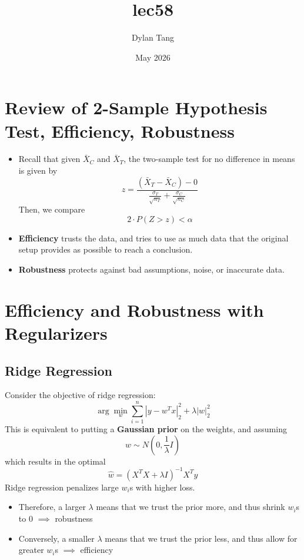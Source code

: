 \documentclass{article}
\title{lec58}
\author{Dylan Tang}
\date{May 2026}
\begin{document}
\maketitle

\section{Review of 2-Sample Hypothesis Test, Efficiency, Robustness}
\begin{itemize}
    \item Recall that given $\bar{X}_C$ and $\bar{X}_T$, the two-sample test for no difference in means is given by
\[
    z = \frac{(\bar{X}_T - \bar{X}_C) - 0}{\frac{\sigma_T}{\sqrt{n_T}} + \frac{\sigma_C}{\sqrt{n_C}}}
\]
Then, we compare
\[
    2 \cdot P(Z > z) < \alpha
\]
\item \textbf{Efficiency} trusts the data, and tries to use as much data that the original setup provides as possible to reach a conclusion.
\item \textbf{Robustness} protects against bad assumptions, noise, or inaccurate data.
\end{itemize}

\section{Efficiency and Robustness with Regularizers}
\subsection{Ridge Regression}
Consider the objective of ridge regression:
\[
    \arg\min_w \sum_{i=1}^n|y-w^Tx|^2_2 + \lambda |w|^2_2
\]
This is equivalent to putting a \textbf{Gaussian prior} on the weights, and assuming 
\[
    w \sim N(0, \frac{1}{\lambda}I)
\]
which results in the optimal
\[
    \hat{w} = (X^TX + \lambda I)^{-1}X^Ty
\]
Ridge regression penalizes large $w_i$s with higher loss.
\begin{itemize}
    \item Therefore, a larger $\lambda$ means that we trust the prior more, and thus shrink $w_i$s to 0 $\implies$ robustness
    \item Conversely, a smaller $\lambda$ means that we trust the prior less, and thus allow for greater $w_i$s $\implies$ efficiency
\end{itemize}
\end{document}
